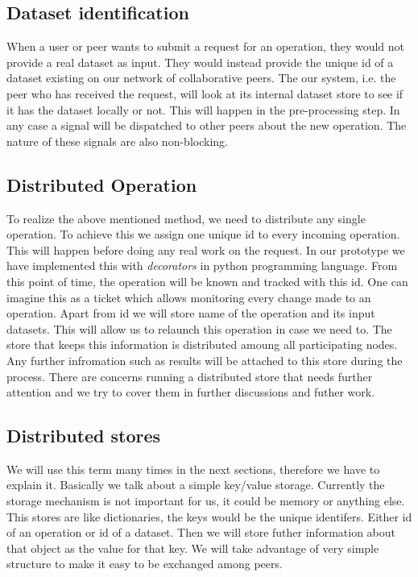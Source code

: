 \subsection{Dataset identification}
When a user or peer wants to submit a request for an operation, they would not provide a real dataset as input.
They would instead provide the unique id of a dataset existing on our network of collaborative peers.
The our system, i.e. the peer who has received the request, will look at its internal dataset store to see if it
has the dataset locally or not.
This will happen in the pre-processing step. 
In any case a signal will be dispatched to other peers about the new operation.
The nature of these signals are also non-blocking.

\subsection{Distributed Operation}
To realize the above mentioned method, we need to distribute any single operation. To achieve this we assign one unique id
to every incoming operation. This will happen before doing any real work on the request. In our prototype we have implemented
this with \textit{decorators} in python programming language. 
From this point of time, 
the operation will be known and tracked with this id. One can imagine this as a ticket which
allows monitoring every change made to an operation. 
Apart from id we will store name of the operation and its input datasets. 
This will allow us to relaunch this operation in case we need to. 
The store that keeps this information is distributed amoung all participating nodes. 
Any further infromation such as results will be attached to this store during the process. 
There are concerns running a distributed store that needs further attention and 
we try to cover them in further discussions and futher work.

\subsection{Distributed stores}
We will use this term many times in the next sections, therefore we have to explain it.
Basically we talk about a simple key/value storage. 
Currently the storage mechanism is not important for us, it could be memory or anything else.
This stores are like dictionaries, the keys would be the unique identifers.
Either id of an operation or id of a dataset. 
Then we will store futher information about that object as the value for that key.
We will take advantage of very simple structure to make it easy to be exchanged among peers.

